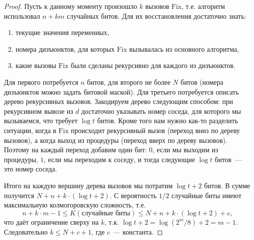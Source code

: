 \documentclass[12pt]{article}
\theoremstyle{definition}
\theoremstyle{plain}
\theoremstyle{remark}
\begin{document}
\begin{proof}
    Пусть к данному моменту произошло $k$ вызовов $\mathrm{Fix}$, т.е. алгоритм
    использовал $n + km$ случайных битов. Для их восстановления достаточно знать:
    \begin{enumerate}
        \item текущие значения переменных,
        \item номера дизъюнктов, для которых $\mathrm{Fix}$ вызывалась из основного алгоритма,
        \item какие вызовы $\mathrm{Fix}$ были сделаны рекурсивно для каждого из дизъюнктов.
    \end{enumerate}
    Для первого потребуется $n$ битов, для второго не более $N$ битов (номера дизъюнктов можно 
    задать битовой маской). Для третьего потребуется описать дерево рекурсивных вызовов. 
    Закодируем дерево следующим способом: при рекурсивном вывозе из $d$ достаточно указывать 
    номер соседа, для которого мы вызываемся, что требует $\log t$ битов. Кроме того
    нам нужно как-то разделить ситуации, когда в $\mathrm{Fix}$ происходит рекурсивный вызов
    (переход вниз по дереву вызовов), а когда выход из процедуры (переход вверх по дереву вызовов). 
    Поэтому на каждый переход добавим один бит: $0$, если мы выходим из процедуры,
    $1$, если мы переходим к соседу, и тогда следующие $\log t$ битов~--- это номер соседа.

    Итого на каждую вершину дерева вызовов мы потратим $\log t + 2$ битов. В сумме получится $N + n + k\cdot(\log t + 2)$.
    С вероятность $1/2$ случайные биты имеют максимальную колмогоровскую сложность, т.е.
    \[
    n+k\cdot m - 1 \le K(\text{случайные биты}) \le N + n + k\cdot(\log t + 2) + c,
    \]
    что даёт ограничение сверху на $k$, т.к. $\log t + 2 = \log (2^m/8) + 2 = m - 1$. 
    Следовательно $k\le N + c + 1$, где $c$~--- константа.
\end{proof}
\end{document}

